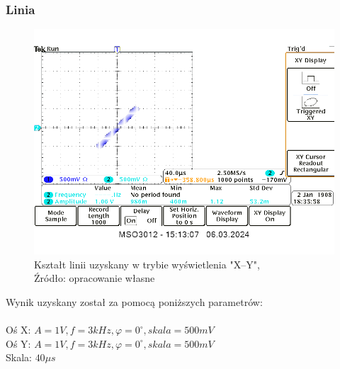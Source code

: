 \documentclass{article}
\begin{document}
      \subsubsection{Linia}
        \begin{figure}[!ht]
          \begin{center}
              \includegraphics[scale=0.25]{grafiki/linia.png}
              \caption{Kształt linii uzyskany w trybie wyświetlenia "X--Y",\\Źródło: opracowanie własne}
          \end{center}
        \end{figure}
        Wynik uzyskany został za pomocą poniższych parametrów: \\ \\
        Oś X: $A = 1V,f = 3kHz, \varphi = 0^\circ, skala = 500mV$ \\
        Oś Y: $A = 1V,f = 3kHz, \varphi = 0^\circ, skala = 500mV$ \\
        Skala: $40 \mu s$
\end{document}

